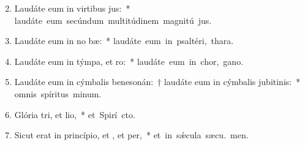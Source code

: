 \begin{flushleft}
\begin{enumerate}[leftmargin=*]
\setcounter{enumi}{1}

\item Laudáte eum in virtibus jus:~* \mbox{laudáte eum secúndum multitúdinem magnitú jus.}
\item Laudáte eum in no bæ:~* \mbox{laudáte eum in psaltéri,  thara.}
\item Laudáte eum in týmpa, et ro:~* \mbox{laudáte eum in chor,  gano.}
\item Laudáte eum in cýmbalis benesonán:~† laudáte eum in cýmbalis jubitinis:~* \mbox{omnis spíritus  minum.}
\item Glória tri, et lio,~* \mbox{et Spirí cto.}
\item Sicut erat in princípio, et , et per,~* \mbox{et in s\'{\ae}cula sæcu. men.}


\end{enumerate}
\end{flushleft}

